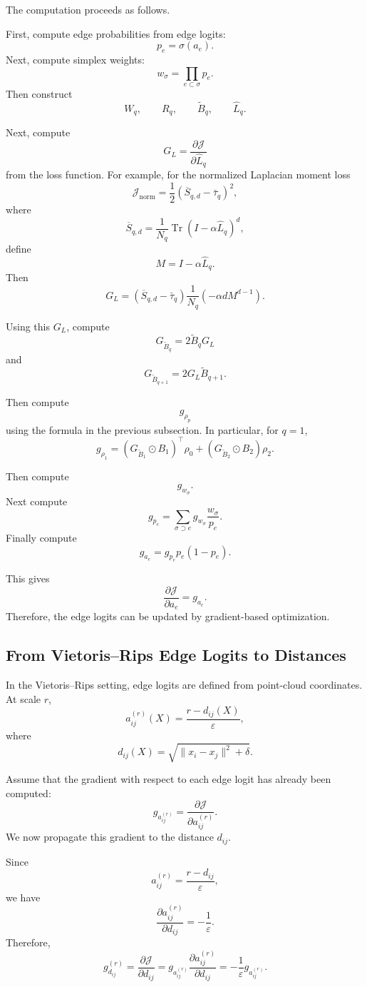 \documentclass[pdflatex,sn-mathphys-ay]{sn-jnl}%
\theoremstyle{thmstyleone}%
\theoremstyle{thmstyletwo}%
\theoremstyle{thmstylethree}%
\begin{document}
\begin{appendices}
The computation proceeds as follows.

First, compute edge probabilities from edge logits:
\[
p_e=\sigma(a_e).
\]
Next, compute simplex weights:
\[
w_\sigma
=
\prod_{e\subset\sigma}p_e.
\]
Then construct
\[
W_q,
\qquad
R_q,
\qquad
\widetilde{B}_q,
\qquad
\widehat{L}_q.
\]

Next, compute
\[
G_L
=
\frac{\partial\mathcal{J}}{\partial \widehat{L}_q}
\]
from the loss function. For example, for the normalized Laplacian moment loss
\[
\mathcal{J}_{\mathrm{norm}}
=
\frac{1}{2}
\left(
\overline{S}_{q,d}
-
\bar{\tau}_q
\right)^2,
\]
where
\[
\overline{S}_{q,d}
=
\frac{1}{N_q}
\operatorname{Tr}
\left(
I-\alpha\widehat{L}_q
\right)^d,
\]
define
\[
M=
I-\alpha\widehat{L}_q.
\]
Then
\[
G_L
=
\left(
\overline{S}_{q,d}
-
\bar{\tau}_q
\right)
\frac{1}{N_q}
\left(
-\alpha d M^{d-1}
\right).
\]

Using this \(G_L\), compute
\[
G_{\widetilde{B}_q}
=
2\widetilde{B}_qG_L
\]
and
\[
G_{\widetilde{B}_{q+1}}
=
2G_L\widetilde{B}_{q+1}.
\]

Then compute
\[
g_{\rho_p}
\]
using the formula in the previous subsection. In particular, for \(q=1\),
\[
g_{\rho_1}
=
\left(
G_{\widetilde{B}_1}
\odot
B_1
\right)^\top
\rho_0
+
\left(
G_{\widetilde{B}_2}
\odot
B_2
\right)
\rho_2.
\]

Then compute
\[
g_{w_\sigma}.
\]
Next compute
\[
g_{p_e}
=
\sum_{\sigma\supset e}
g_{w_\sigma}
\frac{w_\sigma}{p_e}.
\]
Finally compute
\[
g_{a_e}
=
g_{p_e}p_e(1-p_e).
\]

This gives
\[
\frac{\partial\mathcal{J}}{\partial a_e}
=
g_{a_e}.
\]
Therefore, the edge logits can be updated by gradient-based optimization.

\subsection{From Vietoris--Rips Edge Logits to Distances}

In the Vietoris--Rips setting, edge logits are defined from point-cloud coordinates. At scale \(r\),
\[
a_{ij}^{(r)}(X)
=
\frac{r-d_{ij}(X)}{\varepsilon},
\]
where
\[
d_{ij}(X)
=
\sqrt{
\|x_i-x_j\|^2+\delta
}.
\]

Assume that the gradient with respect to each edge logit has already been computed:
\[
g_{a_{ij}^{(r)}}
=
\frac{\partial\mathcal{J}}{\partial a_{ij}^{(r)}}.
\]
We now propagate this gradient to the distance \(d_{ij}\).

Since
\[
a_{ij}^{(r)}
=
\frac{r-d_{ij}}{\varepsilon},
\]
we have
\[
\frac{\partial a_{ij}^{(r)}}{\partial d_{ij}}
=
-\frac{1}{\varepsilon}.
\]
Therefore,
\[
g_{d_{ij}}^{(r)}
=
\frac{\partial\mathcal{J}}{\partial d_{ij}}
=
g_{a_{ij}^{(r)}}
\frac{\partial a_{ij}^{(r)}}{\partial d_{ij}}
=
-\frac{1}{\varepsilon}
g_{a_{ij}^{(r)}}.
\]


\end{appendices}
\end{document}
